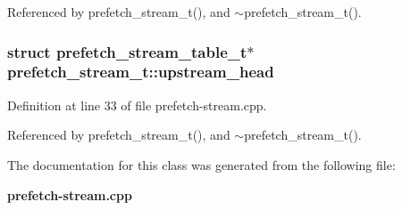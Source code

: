 Referenced by prefetch\_\-stream\_\-t(), and $\sim$prefetch\_\-stream\_\-t().
\subsubsection[{upstream\_\-head}]{\setlength{\rightskip}{0pt plus 5cm}struct {\bf prefetch\_\-stream\_\-table\_\-t}$\ast$ {\bf prefetch\_\-stream\_\-t::upstream\_\-head}\hspace{0.3cm}{\tt  [read, protected]}}\label{classprefetch__stream__t_3e61463fd63604f30bd7dd8550edbeb0}




Definition at line 33 of file prefetch-stream.cpp.

Referenced by prefetch\_\-stream\_\-t(), and $\sim$prefetch\_\-stream\_\-t().

The documentation for this class was generated from the following file:\begin{CompactItemize}
\item 
{\bf prefetch-stream.cpp}\end{CompactItemize}
